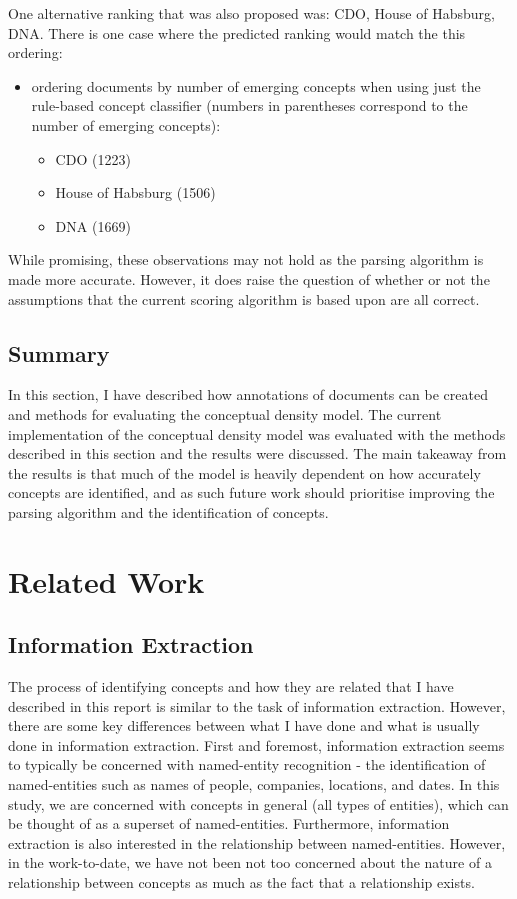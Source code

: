 \documentclass[12pt]{article}
\theoremstyle{grammarstyle}
\begin{document}
One alternative ranking that was also proposed was: CDO, House of Habsburg, DNA.
There is one case where the predicted ranking would match the this ordering:
\begin{itemize}
    \item ordering documents by number of emerging concepts when using just the rule-based concept classifier (numbers in parentheses correspond to the number of emerging concepts):
    \begin{itemize}
        \item CDO (1223)
        \item House of Habsburg (1506)
        \item DNA (1669)
    \end{itemize}
\end{itemize}

While promising, these observations may not hold as the parsing algorithm is made more accurate. However, it does raise the question of whether or not the assumptions that the current scoring algorithm is based upon are all correct.

\subsection{Summary}
In this section, I have described how annotations of documents can be created and methods for evaluating the conceptual density model. The current implementation of the conceptual density model was evaluated with the methods described in this section and the results were discussed. The main takeaway from the results is that much of the model is heavily dependent on how accurately concepts are identified, and as such future work should prioritise improving the parsing algorithm and the identification of concepts.

\section{Related Work} \label{sec:related_work}
\subsection{Information Extraction}
The process of identifying concepts and how they are related that I have described in this report is similar to the task of information extraction. However, there are some key differences between what I have done and what is usually done in information extraction. First and foremost, information extraction seems to typically be concerned with named-entity recognition - the identification of named-entities such as names of people, companies, locations, and dates. In this study, we are concerned with concepts in general (all types of entities), which can be thought of as a superset of named-entities. Furthermore, information extraction is also interested in the relationship between named-entities. However, in the work-to-date, we have not been not too concerned about the nature of a relationship between concepts as much as the fact that a relationship exists.
\end{document}
